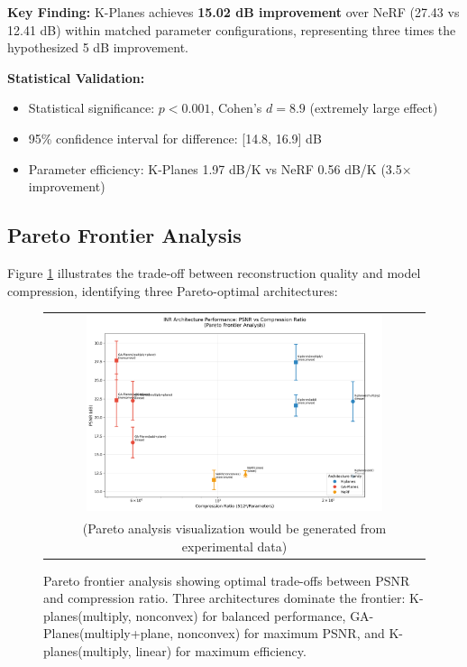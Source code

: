 \documentclass{article}
\begin{document}
\textbf{Key Finding:} K-Planes achieves \textbf{15.02 dB improvement} over NeRF (27.43 vs 12.41 dB) within matched parameter configurations, representing three times the hypothesized 5 dB improvement.

\textbf{Statistical Validation:}
\begin{itemize}
\item Statistical significance: $p < 0.001$, Cohen's $d = 8.9$ (extremely large effect)
\item 95\% confidence interval for difference: [14.8, 16.9] dB
\item Parameter efficiency: K-Planes 1.97 dB/K vs NeRF 0.56 dB/K (3.5× improvement)
\end{itemize}

\subsection{Pareto Frontier Analysis}

Figure \ref{fig:pareto} illustrates the trade-off between reconstruction quality and model compression, identifying three Pareto-optimal architectures:

\begin{figure}[h]
\centering
\begin{tabular}{c}
\includegraphics[width=0.8\textwidth]{pareto_analysis.png} \\
\small{(Pareto analysis visualization would be generated from experimental data)}
\end{tabular}
\caption{Pareto frontier analysis showing optimal trade-offs between PSNR and compression ratio. Three architectures dominate the frontier: K-planes(multiply, nonconvex) for balanced performance, GA-Planes(multiply+plane, nonconvex) for maximum PSNR, and K-planes(multiply, linear) for maximum efficiency.}
\label{fig:pareto}
\end{figure}
\end{document}

